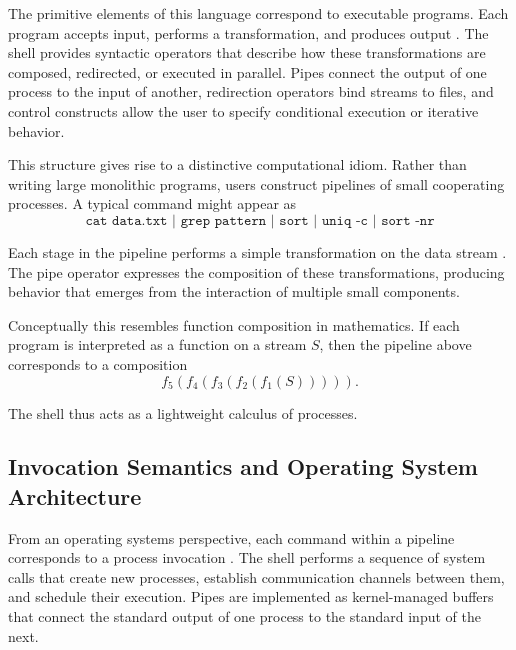 \documentclass[11pt]{article}
\theoremstyle{definition}
\begin{document}
The primitive elements of this language correspond to executable
programs. Each program accepts input, performs a transformation, and
produces output \cite{mcilroy1978}. The shell provides syntactic
operators that describe how these transformations are composed,
redirected, or executed in parallel. Pipes connect the output of one
process to the input of another, redirection operators bind streams to
files, and control constructs allow the user to specify conditional
execution or iterative behavior.

This structure gives rise to a distinctive computational idiom. Rather
than writing large monolithic programs, users construct pipelines of
small cooperating processes. A typical command might appear as
\[
\texttt{cat data.txt | grep pattern | sort | uniq -c | sort -nr}
\]

Each stage in the pipeline performs a simple transformation on the data
stream \cite{raymond2003}. The pipe operator expresses the composition
of these transformations, producing behavior that emerges from the
interaction of multiple small components.

Conceptually this resembles function composition in mathematics. If
each program is interpreted as a function on a stream $S$, then the
pipeline above corresponds to a composition
\[
f_5(f_4(f_3(f_2(f_1(S))))).
\]

The shell thus acts as a lightweight calculus of processes.

\subsection{Invocation Semantics and Operating System Architecture}

From an operating systems perspective, each command within a pipeline
corresponds to a process invocation \cite{ritchie1974}. The shell
performs a sequence of system calls that create new processes, establish
communication channels between them, and schedule their execution. Pipes
are implemented as kernel-managed buffers that connect the standard
output of one process to the standard input of the next.
\end{document}

